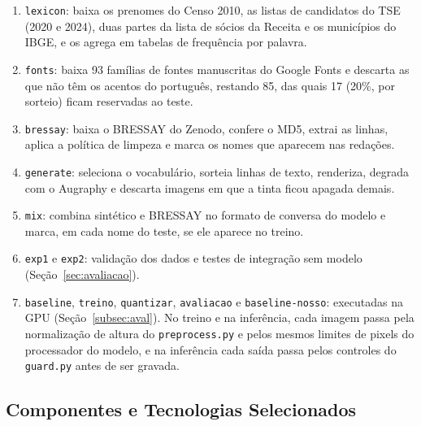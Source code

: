 \documentclass[12pt,a4paper]{article}
\begin{document}
\begin{enumerate}
    \item \texttt{lexicon}: baixa os prenomes do Censo 2010, as listas de candidatos do TSE (2020 e 2024), duas partes da lista de sócios da Receita e os municípios do IBGE, e os agrega em tabelas de frequência por palavra.
    \item \texttt{fonts}: baixa 93 famílias de fontes manuscritas do Google Fonts e descarta as que não têm os acentos do português, restando 85, das quais 17 (20\%, por sorteio) ficam reservadas ao teste.
    \item \texttt{bressay}: baixa o BRESSAY do Zenodo, confere o MD5, extrai as linhas, aplica a política de limpeza e marca os nomes que aparecem nas redações.
    \item \texttt{generate}: seleciona o vocabulário, sorteia linhas de texto, renderiza, degrada com o Augraphy e descarta imagens em que a tinta ficou apagada demais.
    \item \texttt{mix}: combina sintético e BRESSAY no formato de conversa do modelo e marca, em cada nome do teste, se ele aparece no treino.
    \item \texttt{exp1} e \texttt{exp2}: validação dos dados e testes de integração sem modelo (Seção~\ref{sec:avaliacao}).
    \item \texttt{baseline}, \texttt{treino}, \texttt{quantizar}, \texttt{avaliacao} e \texttt{baseline-nosso}: executadas na GPU (Seção~\ref{subsec:aval}). No treino e na inferência, cada imagem passa pela normalização de altura do \texttt{preprocess.py} e pelos mesmos limites de pixels do processador do modelo, e na inferência cada saída passa pelos controles do \texttt{guard.py} antes de ser gravada.
\end{enumerate}

\subsection{Componentes e Tecnologias Selecionados}
\end{document}
